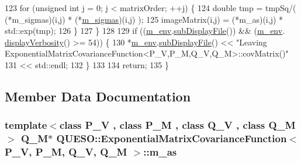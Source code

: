 \begin{DoxyCode}
123     \textcolor{keywordflow}{for} (\textcolor{keywordtype}{unsigned} \textcolor{keywordtype}{int} j = 0; j < matrixOrder; ++j) \{
124       \textcolor{keywordtype}{double} tmp = tmpSq/( (*m\_sigmas)(i,j) * (*\hyperlink{class_q_u_e_s_o_1_1_exponential_matrix_covariance_function_a4da6af8ffd336294a3d7a89c5258099e}{m\_sigmas})(i,j) );
125       imageMatrix(i,j) = (*m\_as)(i,j) * std::exp(tmp);
126     \}
127   \}
128 
129   \textcolor{keywordflow}{if} ((\hyperlink{class_q_u_e_s_o_1_1_base_matrix_covariance_function_a2bf98f6576db775109e240a2d828c578}{m\_env}.\hyperlink{class_q_u_e_s_o_1_1_base_environment_a8a0064746ae8dddfece4229b9ad374d6}{subDisplayFile}()) && (\hyperlink{class_q_u_e_s_o_1_1_base_matrix_covariance_function_a2bf98f6576db775109e240a2d828c578}{m\_env}.
      \hyperlink{class_q_u_e_s_o_1_1_base_environment_a1fe5f244fc0316a0ab3e37463f108b96}{displayVerbosity}() >= 54)) \{
130     *\hyperlink{class_q_u_e_s_o_1_1_base_matrix_covariance_function_a2bf98f6576db775109e240a2d828c578}{m\_env}.\hyperlink{class_q_u_e_s_o_1_1_base_environment_a8a0064746ae8dddfece4229b9ad374d6}{subDisplayFile}() << \textcolor{stringliteral}{"Leaving
       ExponentialMatrixCovarianceFunction<P\_V,P\_M,Q\_V,Q\_M>::covMatrix()"}
131                           << std::endl;
132   \}
133 
134   \textcolor{keywordflow}{return};
135 \}
\end{DoxyCode}


\subsection{Member Data Documentation}
\hypertarget{class_q_u_e_s_o_1_1_exponential_matrix_covariance_function_a63e36890c98437a802ba59be08fb166b}{
\subsubsection[{m\-\_\-as}]{\setlength{\rightskip}{0pt plus 5cm}template$<$class P\-\_\-\-V , class P\-\_\-\-M , class Q\-\_\-\-V , class Q\-\_\-\-M $>$ Q\-\_\-\-M$\ast$ {\bf Q\-U\-E\-S\-O\-::\-Exponential\-Matrix\-Covariance\-Function}$<$ P\-\_\-\-V, P\-\_\-\-M, Q\-\_\-\-V, Q\-\_\-\-M $>$\-::m\-\_\-as\hspace{0.3cm}{\ttfamily [protected]}}}\label{class_q_u_e_s_o_1_1_exponential_matrix_covariance_function_a63e36890c98437a802ba59be08fb166b}


